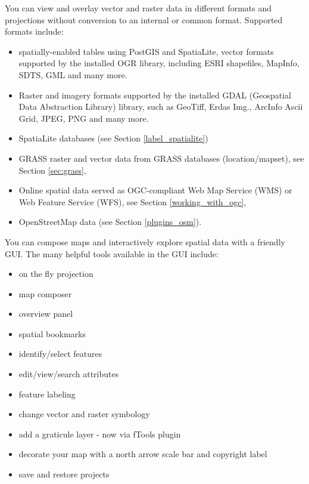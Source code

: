 
You can view and overlay vector and raster data in different formats and
projections without conversion to an internal or common format. Supported
formats include:

\begin{itemize}[label=--]
\item spatially-enabled tables using PostGIS and SpatiaLite, vector 
formats supported by the installed OGR library, including ESRI shapefiles, MapInfo, 
SDTS, GML and many more.
\item Raster and imagery formats supported by the installed GDAL (Geospatial
Data Abstraction Library) library, such as GeoTiff, Erdas Img., ArcInfo Ascii 
Grid, JPEG, PNG and many more.
\item SpatiaLite databases (see Section \ref{label_spatialite}) 
\item GRASS raster and vector data from GRASS databases (location/mapset),
see Section \ref{sec:grass}, 
\item Online spatial data served as OGC-compliant Web Map Service (WMS) or
Web Feature Service (WFS), see Section \ref{working_with_ogc},
\item OpenStreetMap data (see Section \ref{plugins_osm}).
\end{itemize}


You can compose maps and interactively explore spatial data with a friendly
GUI. The many helpful tools available in the GUI include:

\begin{itemize}[label=--]
\item on the fly projection
\item map composer
\item overview panel
\item spatial bookmarks
\item identify/select features
\item edit/view/search attributes
\item feature labeling
\item change vector and raster symbology
\item add a graticule layer - now via fTools plugin
\item decorate your map with a north arrow scale bar and copyright label
\item save and restore projects
\end{itemize}

